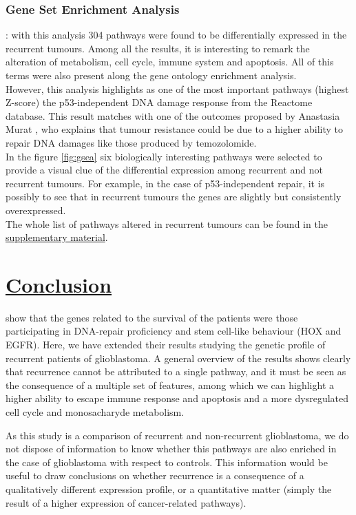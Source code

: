 \documentclass[9pt,twocolumn,twoside]{gsajnl}
\begin{document}
\subsubsection*{Gene Set Enrichment Analysis}: with this analysis 304 pathways were found to be differentially expressed in the recurrent tumours. Among all the results, it is interesting to remark the alteration of metabolism, cell cycle, immune system and apoptosis. All of this terms were also present along the gene ontology enrichment analysis.\\
However, this analysis highlights as one of the most important pathways (highest Z-score) the p53-independent DNA damage response from the Reactome database. This result matches with one of the outcomes proposed by Anastasia Murat \citep{Murat2008}, who explains that tumour resistance could be due to a higher ability to repair DNA damages like those produced by temozolomide.\\
In the figure \ref{fig:gsea} six biologically interesting pathways were selected to provide a visual clue of the differential expression among recurrent and not recurrent tumours. For example, in the case of p53-independent repair, it is possibly to see that in recurrent tumours the genes are slightly but consistently overexpressed.\\
The whole list of pathways altered in recurrent tumours can be found in the \href{http://ieoproject.tk/ieo/supplementary/workflow_report.html}{supplementary material}.

\section*{\underline{Conclusion}}
\cite{Murat2008} show that the genes related to the survival of the patients were those participating in DNA-repair proficiency and stem cell-like behaviour (HOX and EGFR). Here, we have extended their results studying the genetic profile of recurrent patients of glioblastoma. A general overview of the results shows clearly that recurrence cannot be attributed to a single pathway, and it must be seen as the consequence of a multiple set of features, among which we can highlight a higher ability to escape immune response and apoptosis and a more dysregulated cell cycle and monosacharyde metabolism.

As this study is a comparison of recurrent and non-recurrent glioblastoma, we do not dispose of information to know whether this pathways are also enriched in the case of glioblastoma with respect to controls. This information would be useful to draw conclusions on whether recurrence is a consequence of a qualitatively different expression profile, or a quantitative matter (simply the result of a higher expression of cancer-related pathways).
\end{document}
